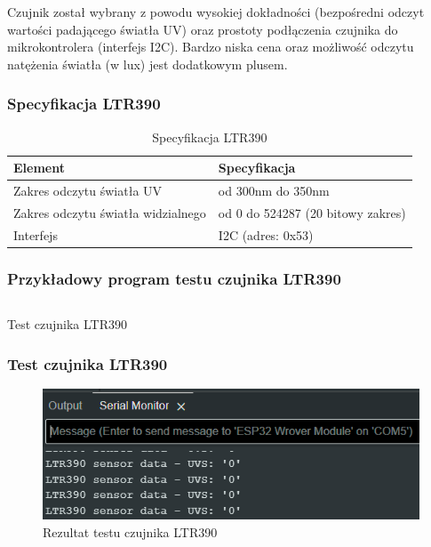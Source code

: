 \documentclass[12pt,a4paper]{article}
\begin{document}
Czujnik został wybrany z powodu wysokiej dokładności (bezpośredni odczyt wartości padającego światła UV) oraz prostoty podłączenia czujnika do mikrokontrolera (interfejs I2C). Bardzo niska cena oraz możliwość odczytu natężenia światła (w lux) jest dodatkowym plusem.

\subsubsection{Specyfikacja LTR390}

\begin{table}[H]
    \centering
    \begin{tabular}{|l|l|}
        \hline
        Element & Specyfikacja \\
        \hline
        Zakres odczytu światła UV & od 300nm do 350nm \\
        \hline
        Zakres odczytu światła widzialnego & od 0 do 524287 (20 bitowy zakres) \\
        \hline
        Interfejs & I2C (adres: 0x53) \\
        \hline
    \end{tabular}
    \caption{Specyfikacja LTR390}
    \label{ltr390-spec}
\end{table}

\subsubsection{Przykładowy program testu czujnika LTR390}
\begin{code}[H]
\inputminted[frame=lines,baselinestretch=1,breaklines,linenos,xleftmargin=1.5em]{c}{../proj/ltr390-test/ltr390-test.ino}

\caption{Test czujnika LTR390}
\end{code}

\subsubsection{Test czujnika LTR390}
\begin{figure}[H]
    \centering
    \includegraphics[width=\textwidth]{ltr390-test.png}
    \caption{Rezultat testu czujnika LTR390}
\end{figure}
\end{document}
